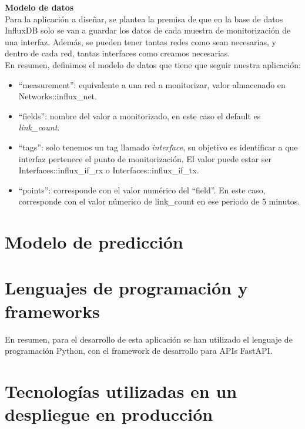 \documentclass[a4paper, oneside, 12pt]{book}
\begin{document}
	\pagebreak

	\noindent \textbf{\large Modelo de datos} \\
	
	\noindent Para la aplicación a diseñar, se plantea la premisa de que en la base de datos InfluxDB solo se van a guardar los datos de cada muestra de monitorización de una interfaz. Además, se pueden tener tantas redes como sean necesarias, y dentro de cada red, tantas interfaces como creamos necesarias. \\
	
	\noindent En resumen, definimos el modelo de datos que tiene que seguir nuestra aplicación:
	
	\begin{itemize}
		\item ``measurement'': equivalente a una red a monitorizar, valor almacenado en Networks::influx\_net.
		\item ``fields'': nombre del valor a monitorizado, en este caso el default es \textit{link\_count}.
		\item ``tags'': solo tenemos un tag llamado \textit{interface}, su objetivo es identificar a que interfaz pertenece el punto de monitorización. El valor puede estar ser Interfaces::influx\_if\_rx o Interfaces::influx\_if\_tx.
		\item ``points'': corresponde con el valor numérico del ``field''. En este caso, corresponde con el valor númerico de link\_count en ese periodo de 5 minutos.
	\end{itemize} 
	
	
	\pagebreak
	
	\section{Modelo de predicción}
	
	\pagebreak
	
	\section[Lenguajes y frameworks]{Lenguajes de programación y frameworks}
	
	\noindent En resumen, para el desarrollo de esta aplicación se han utilizado el lenguaje de programación Python, con el framework de desarrollo para APIs FastAPI.
	
	\pagebreak
	
	\section[Despliegue en Producción]{Tecnologías utilizadas en un despliegue en producción}
	
\end{document}
